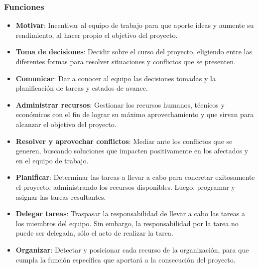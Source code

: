     \subsubsection{Funciones}
            \begin{itemize}
                \item \textbf{Motivar}:
                Incentivar al equipo de trabajo para que aporte ideas y aumente su rendimiento, al hacer propio el objetivo del proyecto.
                
                \item \textbf{Toma de decisiones}:
                Decidir sobre el curso del proyecto, eligiendo entre las diferentes formas para resolver situaciones y conflictos que se presenten.
                
                \item \textbf{Comunicar}:
                Dar a conocer al equipo las decisiones tomadas y la planificación de tareas y estados de avance.
                
                \item \textbf{Administrar recursos}:
                Gestionar los recursos humanos, técnicos y económicos con el fin de lograr su máximo aprovechamiento y que sirvan para alcanzar el objetivo del proyecto.
                
                \item \textbf{Resolver y aprovechar conflictos}:
                Mediar ante los conflictos que se generen, buscando soluciones que impacten positivamente en los afectados y en el equipo de trabajo.
                
                \item \textbf{Planificar}:
                Determinar las tareas a llevar a cabo para concretar exitosamente el proyecto, administrando los recursos disponibles.
                Luego, programar y asignar las tareas resultantes.
                
                \item \textbf{Delegar tareas}:
                Traspasar la responsabilidad de llevar a cabo las tareas a los miembros del equipo.
                Sin embargo, la responsabilidad por la tarea no puede ser delegada, sólo el acto de realizar la tarea.
                
                \item \textbf{Organizar}:
                Detectar y posicionar cada recurso de la organización, para que cumpla la función específica que aportará a la consecución del proyecto.
                

\end{itemize}
